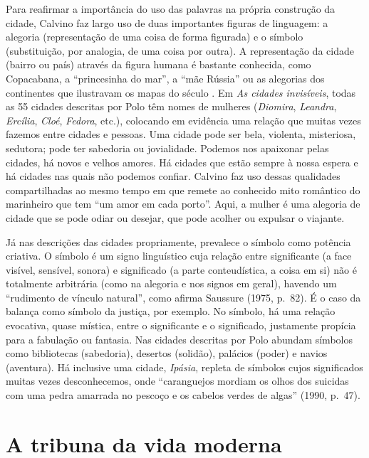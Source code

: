 Para reafirmar a importância do uso das palavras na própria construção
da cidade, Calvino faz largo uso de duas importantes figuras de
linguagem: a alegoria (representação de uma coisa de forma figurada) e o
símbolo (substituição, por analogia, de uma coisa por outra). A
representação da cidade (bairro ou país) através da figura humana é
bastante conhecida, como Copacabana, a ``princesinha do mar'', a ``mãe
Rússia'' ou as alegorias dos continentes que ilustravam os mapas do
século . Em \emph{As cidades invisíveis}, todas as 55 cidades
descritas por Polo têm nomes de mulheres (\emph{Diomira},
\emph{Leandra}, \emph{Ercília}, \emph{Cloé}, \emph{Fedora}, etc.),
colocando em evidência uma relação que muitas vezes fazemos entre
cidades e pessoas. Uma cidade pode ser bela, violenta, misteriosa,
sedutora; pode ter sabedoria ou jovialidade. Podemos nos apaixonar pelas
cidades, há novos e velhos amores. Há cidades que estão sempre à nossa
espera e há cidades nas quais não podemos confiar. Calvino faz uso dessas
qualidades compartilhadas ao mesmo tempo em que remete ao conhecido mito
romântico do marinheiro que tem ``um amor em cada porto''. Aqui, a
mulher é uma alegoria de cidade que se pode odiar ou desejar, que pode
acolher ou expulsar o viajante.

Já nas descrições das cidades propriamente, prevalece o símbolo como
potência criativa. O símbolo é um signo linguístico cuja relação entre
significante (a face visível, sensível, sonora) e significado (a parte
conteudística, a coisa em si) não é totalmente arbitrária (como na
alegoria e nos signos em geral), havendo um ``rudimento de vínculo
natural'', como afirma Saussure (1975, p.~82). É o caso da balança como
símbolo da justiça, por exemplo. No símbolo, há uma relação evocativa,
quase mística, entre o significante e o significado, justamente propícia
para a fabulação ou fantasia. Nas cidades descritas por Polo abundam
símbolos como bibliotecas (sabedoria), desertos (solidão), palácios
(poder) e navios (aventura). Há inclusive uma cidade, \emph{Ipásia},
repleta de símbolos cujos significados muitas vezes desconhecemos, onde
``caranguejos mordiam os olhos dos suicidas com uma pedra amarrada no
pescoço e os cabelos verdes de algas'' (1990, p.~47).

\chapter{A tribuna da vida moderna}

